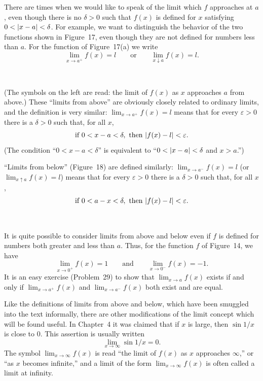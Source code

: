There are times when we would like to speak of the limit which $f$ approaches
at $a$, even though there is no $\delta>0$ such that $f(x)$ is defined for $x$
satisfying $0<\lvert x-a\rvert<\delta$. For example, we want to distinguish the
behavior of the two functions shown in Figure~17, even though they are not
defined for numbers less than $a$. For the function of Figure~17(a) we write
\[
\lim_{x\to a^+}f(x)=l \qquad\text{or}\qquad \lim_{x\downarrow a}f(x)=l.
\]

\begin{center}
\\[0.6em]
\end{center}
(The symbols on the left are read: the limit of $f(x)$ as $x$ approaches $a$
from above.) These ``limits from above'' are obviously closely related to
ordinary limits, and the definition is very similar:
$\lim_{x\to a^+}f(x)=l$ means that for every $\varepsilon>0$ there is a
$\delta>0$ such that, for all $x$,
\[
\text{if }0<x-a<\delta,\text{ then }\lvert f(x)-l\rvert<\varepsilon.
\]
(The condition ``$0<x-a<\delta$'' is equivalent to
``$0<\lvert x-a\rvert<\delta$ and $x>a$.'')

``Limits from below'' (Figure~18) are defined similarly:
$\lim_{x\to a^-}f(x)=l$ (or $\lim_{x\uparrow a}f(x)=l$) means that for every
$\varepsilon>0$ there is a $\delta>0$ such that, for all $x$,
\[
\text{if }0<a-x<\delta,\text{ then }\lvert f(x)-l\rvert<\varepsilon.
\]

\begin{center}
\\[0.6em]
\end{center}
It is quite possible to consider limits from above and below even if $f$ is
defined for numbers both greater and less than $a$. Thus, for the function $f$
of Figure~14, we have
\[
\lim_{x\to 0^+}f(x)=1 \qquad\text{and}\qquad \lim_{x\to 0^-}f(x)=-1.
\]
It is an easy exercise (Problem~29) to show that $\lim_{x\to a}f(x)$ exists if
and only if $\lim_{x\to a^+}f(x)$ and $\lim_{x\to a^-}f(x)$ both exist and are
equal.

Like the definitions of limits from above and below, which have been smuggled
into the text informally, there are other modifications of the limit concept
which will be found useful. In Chapter~4 it was claimed that if $x$ is large,
then $\sin 1/x$ is close to $0$. This assertion is usually written
\[
\lim_{x\to\infty}\sin 1/x=0.
\]
The symbol $\lim_{x\to\infty}f(x)$ is read ``the limit of $f(x)$ as $x$
approaches $\infty$,'' or ``as $x$ becomes infinite,'' and a limit of the form
$\lim_{x\to\infty}f(x)$ is often called a limit at infinity.


